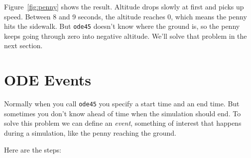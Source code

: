Figure~\ref{fig:penny} shows the result.  Altitude drops slowly at first and picks up speed.  Between 8 and 9 seconds, the altitude reaches 0, which means the penny hits the sidewalk.  But \lstinline{ode45} doesn't know where the ground is, so the penny keeps going through zero into negative altitude.  We'll solve that problem in the next section.
\newpage
\section{ODE Events}
\label{events}


Normally when you call \lstinline{ode45} you specify a start time and
an end time.  But sometimes you don't know ahead of time when the
simulation should end.  To solve this problem we can define an \emph{event}, 
something of interest that happens during a simulation,
like the penny reaching the ground.

Here are the steps: 


